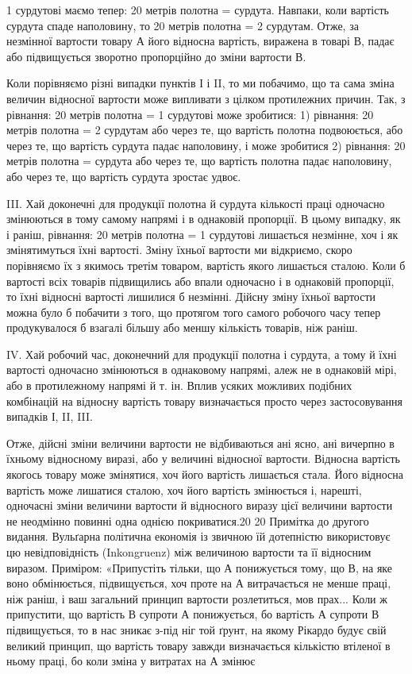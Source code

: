 1 сурдутові маємо тепер: 20 метрів полотна =  сурдута. Навпаки,
коли вартість сурдута спаде наполовину, то 20 метрів полотна
= 2 сурдутам. Отже, за незмінної вартости товару А його
відносна вартість, виражена в товарі В, падає або підвищується
зворотно пропорційно до зміни вартости В.

Коли порівняємо різні випадки пунктів І і II, то ми побачимо,
що та сама зміна величин відносної вартости може випливати з
цілком протилежних причин. Так, з рівнання: 20 метрів полотна
= 1 сурдутові може зробитися: 1) рівнання: 20 метрів
полотна = 2 сурдутам або через те, що вартість полотна подвоюється,
або через те, що вартість сурдута падає наполовину, і
може зробитися 2) рівнання: 20 метрів полотна =  сурдута
або через те, що вартість полотна падає наполовину, або через те,
що вартість сурдута зростає удвоє.

III. Хай доконечні для продукції полотна й сурдута кількості
праці одночасно змінюються в тому самому напрямі і в однаковій
пропорції. В цьому випадку, як і раніш, рівнання: 20 метрів
полотна = 1 сурдутові лишається незмінне, хоч і як змінятимуться
їхні вартості. Зміну їхньої вартости ми відкриємо, скоро
порівняємо їх з якимось третім товаром, вартість якого лишається
сталою. Коли б вартості всіх товарів підвищились або впали
одночасно і в однаковій пропорції, то їхні відносні вартості лишилися
б незмінні. Дійсну зміну їхньої вартости можна було б
побачити з того, що протягом того самого робочого часу тепер
продукувалося б взагалі більшу або меншу кількість товарів,
ніж раніш.

IV. Хай робочий час, доконечний для продукції полотна і
сурдута, а тому й їхні вартості одночасно змінюються в однаковому
напрямі, алеж не в однаковій мірі, або в протилежному
напрямі й т. ін. Вплив усяких можливих подібних комбінацій
на відносну вартість товару визначається просто через застосовування
випадків І, II, III.

Отже, дійсні зміни величини вартости не відбиваються ані
ясно, ані вичерпно в їхньому відносному виразі, або у величині
відносної вартости. Відносна вартість якогось товару може змінятися,
хоч його вартість лишається стала. Його відносна вартість
може лишатися сталою, хоч його вартість змінюється і, нарешті,
одночасні зміни величини вартости й відносного виразу
цієї величини вартости не неодмінно повинні одна однією покриватися.20
20 Примітка до другого видання. Вульґарна політична економія
із звичною їй дотепністю використовує цю невідповідність (Inkongruenz)
між величиною вартости та її відносним виразом. Приміром: «Припустіть
тільки, що А понижується тому, що В, на яке воно обмінюється, підвищується,
хоч проте на А витрачається не менше праці, ніж раніш, і
ваш загальний принцип вартости розлетиться, мов прах... Коли ж припустити,
що вартість В супроти А понижується, бо вартість А супроти В
підвищується, то в нас зникає з-під ніг той ґрунт, на якому Рікардо
будує свій великий принцип, що вартість товару завжди визначається
кількістю втіленої в ньому праці, бо коли зміна у витратах на А змінює
